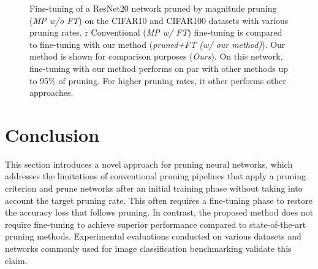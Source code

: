 \begin{figure}
\centering
{}
  \caption{ Fine-tuning of a ResNet20 network pruned by magnitude
  pruning (\emph{MP w/o FT}) on the CIFAR10 and CIFAR100 datasets with various
  pruning rates. r  Conventional (\emph{MP w/ FT}) fine-tuning is compared to
  fine-tuning with our method (\emph{pruned+FT (w/ our method)}). Our method is
  shown for comparison purposes (\emph{Ours}). On this network, fine-tuning with
  our method performs on par with other methods up to 95\% of pruning. For
  higher pruning rates, it other performs other approaches.}
    \label{fig:chap1:finetuning_impact_vgg6}
\end{figure}




\section{Conclusion}
\label{sec:chap1:conclusion}


This section introduces a novel approach for pruning neural networks, which
addresses the limitations of conventional pruning pipelines that apply a pruning
criterion and prune networks after an initial training phase without taking into
account the target pruning rate. This often requires a fine-tuning phase to
restore the accuracy loss that follows pruning. In contrast, the proposed method
does not require fine-tuning to achieve superior performance compared to
state-of-the-art pruning methods. Experimental evaluations conducted on
various datasets and networks commonly used for image classification
benchmarking validate this claim.\\

